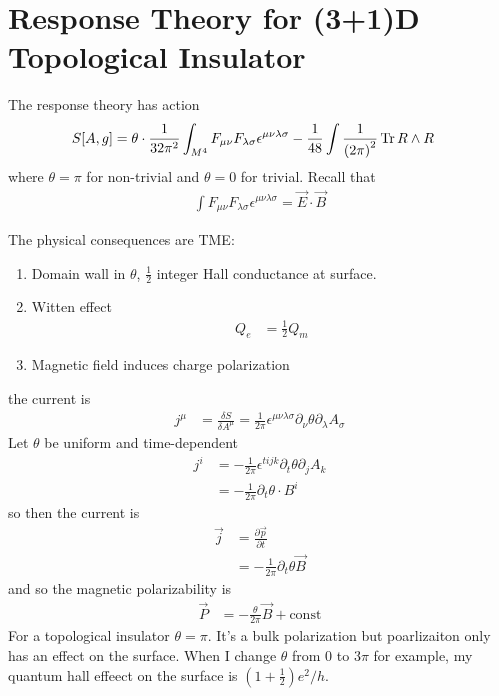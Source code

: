 \section{Response Theory for (3+1)D Topological Insulator}
The response theory has action
\begin{align}
    S[A,g] &=
    \theta\cdot \frac{1}{32\pi^2}
    \int_{M^4} F_{\mu\nu}F_{\lambda\sigma} \epsilon^{\mu\nu\lambda\sigma}
    - \frac{1}{48}
    \int \frac{1}{\left( 2\pi \right)^2} \Tr R\wedge R
\end{align}
where $\theta=\pi$ for non-trivial and $\theta=0$ for trivial.
Recall that
\begin{align}
    \int F_{\mu\nu}F_{\lambda\sigma} \epsilon^{\mu\nu\lambda\sigma}
    =
    \vec{E}\cdot\vec{B}
\end{align}

The physical consequences are TME:
\begin{enumerate}
    \item Domain wall in $\theta$, $\frac{1}{2}$ integer Hall conductance at
        surface.
    \item Witten effect
        \begin{align}
            Q_e &= \frac{1}{2}Q_m
        \end{align}
    \item Magnetic field induces charge polarization
\end{enumerate}
the current is
\begin{align}
    j^{\mu} &= \frac{\delta S}{\delta A^\mu}
    = \frac{1}{2\pi} \epsilon^{\mu\nu\lambda\sigma}
    \partial_\nu \theta \partial_\lambda A_\sigma
\end{align}
Let $\theta$ be uniform and time-dependent
\begin{align}
    j^i &=
    -\frac{1}{2\pi}
    \epsilon^{tijk} \partial_t \theta \partial_j A_k\\
    &= -\frac{1}{2\pi}\partial_t \theta\cdot B^i
\end{align}
so then the current is
\begin{align}
    \vec{j} &=
    \frac{\partial\vec{p}}{\partial t}\\
    &=
    -\frac{1}{2\pi} \partial_t \theta \vec{B}
\end{align}
and so the magnetic polarizability is
\begin{align}
    \vec{P} &=
    -\frac{\theta}{2\pi}\vec{B} + \mathrm{const}
\end{align}
For a topological insulator $\theta=\pi$.
It's a bulk polarization but poarlizaiton only has an effect on the surface.
When I change $\theta$ from 0 to $3\pi$ for example,
my quantum hall effeect on the surface is $\left(1 + \frac{1}{2}\right)e^2/h$.

